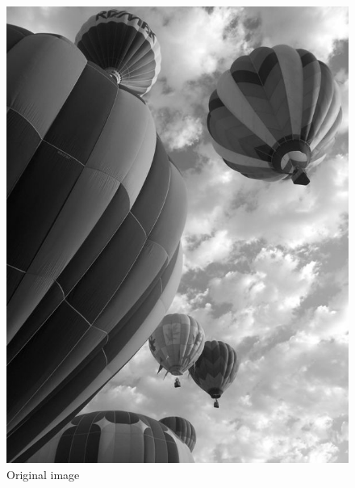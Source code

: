 \begin{figure}
\begin{minipage}[b]{.47\linewidth}
\centering
\includegraphics[width=\textwidth]{baloons_resized_bw.jpg}
\caption*{Original image}
\end{minipage}
\hspace{0.5cm}
\begin{minipage}[b]{0.47\linewidth}
\centering

\end{minipage}
\end{figure}
